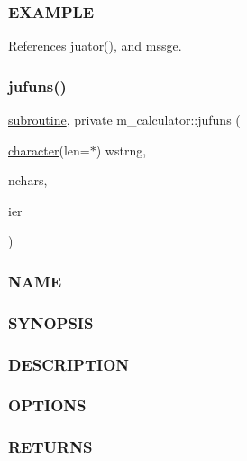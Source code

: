\subsubsection*{E\+X\+A\+M\+P\+LE}

References juator(), and mssge.

\mbox{\label{namespacem__calculator_ab9afbbbd87dd1434f72853350afec2a6}} 
\subsubsection{\texorpdfstring{jufuns()}{jufuns()}}
{\footnotesize\ttfamily \hyperlink{M__stopwatch_83_8txt_acfbcff50169d691ff02d4a123ed70482}{subroutine}, private m\+\_\+calculator\+::jufuns (\begin{DoxyParamCaption}\item[{\hyperlink{option__stopwatch_83_8txt_abd4b21fbbd175834027b5224bfe97e66}{character}(len=$\ast$)}]{wstrng,  }\item[{}]{nchars,  }\item[{}]{ier }\end{DoxyParamCaption})\hspace{0.3cm}{\ttfamily [private]}}



\subsubsection*{N\+A\+ME}

\subsubsection*{S\+Y\+N\+O\+P\+S\+IS}

\subsubsection*{D\+E\+S\+C\+R\+I\+P\+T\+I\+ON}

\subsubsection*{O\+P\+T\+I\+O\+NS}

\subsubsection*{R\+E\+T\+U\+R\+NS}

